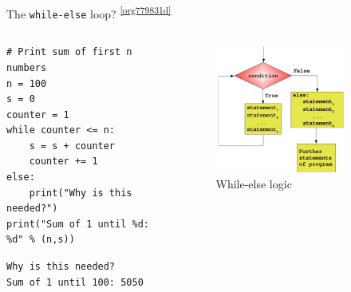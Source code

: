 \documentclass[presentation]{beamer}
\begin{document}
\begin{frame}[label={sec:org6c1b2d4},fragile]{The \texttt{while-else} loop? \textsuperscript{\ref{org779831d}}}
 \begin{columns}
\begin{column}{0.48\columnwidth}
\scriptsize
\begin{verbatim}
# Print sum of first n numbers
n = 100
s = 0
counter = 1
while counter <= n:
    s = s + counter
    counter += 1
else:
    print("Why is this needed?")
print("Sum of 1 until %d: %d" % (n,s))
\end{verbatim}

\begin{verbatim}
Why is this needed?
Sum of 1 until 100: 5050
\end{verbatim}
\end{column}

\begin{column}{0.45\columnwidth}
\footnotesize
\begin{figure}[htbp]
\centering
\includegraphics[width=0.8\textwidth]{images/while_loop_with_else.png}
\caption{While-else logic}
\end{figure}
\end{column}
\end{columns}

\end{frame}
\end{document}
